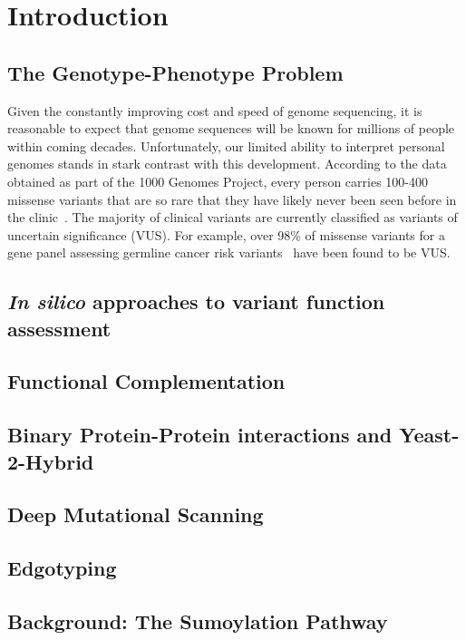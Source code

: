 
\chapter{Introduction}

\section{The Genotype-Phenotype Problem}

Given the constantly improving cost and speed of genome sequencing, it is reasonable to expect that genome sequences will be known for millions of people within coming decades. Unfortunately, our limited ability to interpret personal genomes stands in stark contrast with this development. According to the data obtained as part of the 1000 Genomes Project, every person carries 100-400 missense variants that are so rare that they have likely never been seen before in the clinic~\cite{1000genomes}. The majority of clinical variants  are currently classified as variants of uncertain significance (VUS). For example, over 98\% of missense variants for a gene panel assessing germline cancer risk variants~\cite{Maxwell2016} have been found to be VUS.

\section{\textit{In silico} approaches to variant function assessment}

\section{Functional Complementation}

\section{Binary Protein-Protein interactions and Yeast-2-Hybrid}

\section{Deep Mutational Scanning}

\section{Edgotyping}

\section{Background: The Sumoylation Pathway}